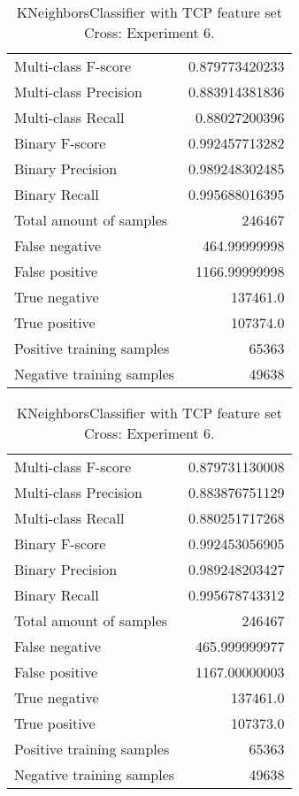 \begin{table}[H]
\begin{minipage}{0.5\textwidth}
\caption{KNeighborsClassifier with TCP feature set Cross: Experiment 5.}
\centering
\begin{tabular}{l r}
\toprule
Multi-class F-score & 0.879773420233 \\
Multi-class Precision & 0.883914381836 \\
Multi-class Recall & 0.88027200396 \\
\midrule
Binary F-score & 0.992457713282 \\
Binary Precision & 0.989248302485 \\
Binary Recall & 0.995688016395 \\
\midrule
Total amount of samples & 246467 \\
False negative & 464.99999998 \\
False positive & 1166.99999998 \\
True negative & 137461.0 \\
True positive & 107374.0 \\
\midrule
Positive training samples & 65363 \\
Negative training samples & 49638 \\
\bottomrule
\end{tabular}
\end{minipage}
\hfillx
\begin{minipage}{0.5\textwidth}
\caption{KNeighborsClassifier with TCP feature set Cross: Experiment 6.}
\centering
\begin{tabular}{l r}
\toprule
Multi-class F-score & 0.879731130008 \\
Multi-class Precision & 0.883876751129 \\
Multi-class Recall & 0.880251717268 \\
\midrule
Binary F-score & 0.992453056905 \\
Binary Precision & 0.989248203427 \\
Binary Recall & 0.995678743312 \\
\midrule
Total amount of samples & 246467 \\
False negative & 465.999999977 \\
False positive & 1167.00000003 \\
True negative & 137461.0 \\
True positive & 107373.0 \\
\midrule
Positive training samples & 65363 \\
Negative training samples & 49638 \\
\bottomrule
\end{tabular}
\end{minipage}
\end{table}
